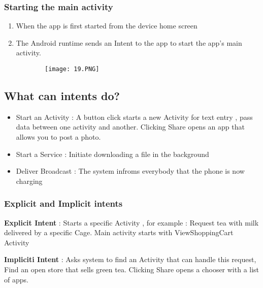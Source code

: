 \documentclass{article}
\begin{document}
\vspace{50mm}

  \subsubsection{Starting the main activity}

  \begin{enumerate}
      \item When the app is first started from the device home screen
      \item The Android runtime sends an Intent to the app to start the app's main activity.
  \end{enumerate}

      \begin{figure}[ht!]
  \centering
  \begin{subfigure}[b]{0.6\linewidth}
    \texttt{[image: 19.PNG]}
  \end{subfigure}
  \end{figure}

  \subsection{What can intents do?}

  \begin{itemize}
      \item Start an Activity : A button click starts a new Activity for text entry , pass data between one activity and another. Clicking Share opens an app that allows you to post a photo.
      \item Start a Service : Initiate downloading a file in the background
      \item Deliver Broadcast : The system infroms everybody that the phone is now charging
  \end{itemize}

  \subsubsection{Explicit and Implicit intents}

  \textbf{Explicit Intent} : Starts a specific Activity , for example : Request tea with milk delivered by a specific Cage. Main activity starts with ViewShoppingCart Activity

  \textbf{Impliciti Intent} : Asks system to find an Activity that can handle this request, Find an open store that sells green tea. Clicking Share opens a chooser with a list of apps.
\end{document}
